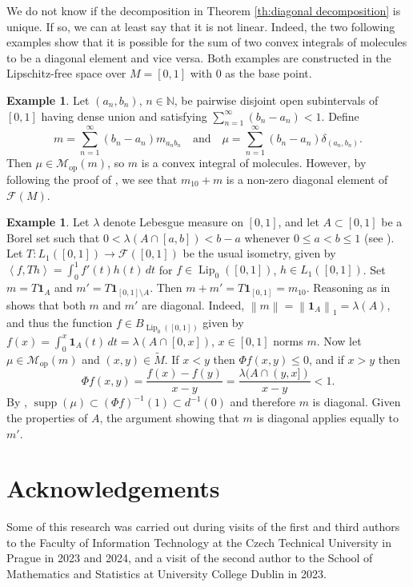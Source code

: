 \documentclass[a4paper,10pt]{amsart}
\DeclareMathOperator{\supp}{supp}                           %
\DeclareMathOperator{\Lip}{Lip}                             %
\newcommand{\NN}{\mathbb{N}}                                %
\newcommand{\norm}[1]{\left\|{#1}\right\|}                  %
\newcommand{\duality}[1]{\left<{#1}\right>}                 %
\newcommand{\lipfree}[1]{\mathcal{F}({#1})}                 %
\newcommand{\wt}[1]{\widetilde{#1}}                         %
\newcommand{\opr}[1]{\mathcal{M}_{\mathrm{op}}(#1)}         %
\renewcommand{\leq}{\leqslant}
\theoremstyle{plain}
\theoremstyle{definition}
\newtheorem{example}[theorem]{Example}
\theoremstyle{remark}
\begin{document}
We do not know if the decomposition in Theorem \ref{th:diagonal decomposition} is unique. If so, we can at least say that it is not linear. Indeed, the two following examples show that it is possible for the sum of two convex integrals of molecules to be a diagonal element and vice versa. Both examples are constructed in the Lipschitz-free space over $M=[0,1]$ with $0$ as the base point.

\begin{example}
Let $(a_n,b_n)$, $n \in \NN$, be pairwise disjoint open subintervals of $[0,1]$ having dense union and satisfying $\sum_{n=1}^\infty (b_n-a_n) < 1$. Define
$$
m=\sum_{n=1}^\infty (b_n-a_n)m_{a_nb_n} \quad\text{and}\quad \mu = \sum_{n=1}^\infty (b_n-a_n)\delta_{(a_n,b_n)} .
$$
Then $\mu \in \opr{m}$, so $m$ is a convex integral of molecules. However, by following the proof of \cite[Theorem 4.1]{APS1}, we see that $m_{10}+m$ is a non-zero diagonal element of $\lipfree{M}$.
\end{example}

\begin{example}
Let $\lambda$ denote Lebesgue measure on $[0,1]$, and let $A\subset [0,1]$ be a Borel set such that $0 < \lambda(A \cap [a,b]) < b-a$ whenever $0 \leq a < b \leq 1$ (see \cite{Rudin83}). Let $T:L_1([0,1])\to\lipfree{[0,1]}$ be the usual isometry, given by $\duality{f,Th}=\int_0^1 f'(t)h(t)\,dt$ for $f \in \Lip_0([0,1])$, $h \in L_1([0,1])$. Set $m=T\mathbf{1}_A$ and $m'=T\mathbf{1}_{[0,1]\setminus A}$. Then $m+m'=T\mathbf{1}_{[0,1]}=m_{10}$. Reasoning as in \cite[Theorem 4.1]{APS1} shows that both $m$ and $m'$ are diagonal. Indeed, $\norm{m}=\norm{\mathbf{1}_A}_1=\lambda(A)$, and thus the function $f \in B_{\Lip_0([0,1])}$ given by $f(x)=\int_0^x \mathbf{1}_A(t) \,dt = \lambda(A \cap [0,x])$, $x \in [0,1]$ norms $m$. Now let $\mu \in \opr{m}$ and $(x,y) \in \wt{M}$. If $x < y$ then $\Phi f(x,y) \leq 0$, and if $x>y$ then
\[
\Phi f(x,y) = \frac{f(x)-f(y)}{x-y} = \frac{\lambda(A \cap (y,x])}{x-y} < 1.
\]
By \cite[Lemma 2.3]{APS1}, $\supp(\mu) \subset (\Phi f)^{-1}(1) \subset d^{-1}(0)$ and therefore $m$ is diagonal.  Given the properties of $A$, the argument showing that $m$ is diagonal applies equally to $m'$.
\end{example}


\section*{Acknowledgements}

Some of this research was carried out during visits of the first and third authors to the Faculty of Information Technology at the Czech Technical University in Prague in 2023 and 2024, and a visit of the second author to the School of Mathematics and Statistics at University College Dublin in 2023.
\end{document}
